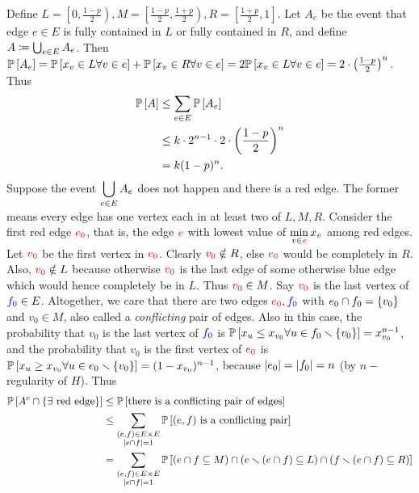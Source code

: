 {Define $L=\left[0,\frac{1-p}{2}\right), M=\left[\frac{1-p}2,\frac{1+p}2\right), R=\left[\frac{1+p}2,1\right]$. Let $A_e$ be the event that edge $e\in E$ is fully contained in $L$ or fully contained in $R$, and define $A\sett \bigcup_{e\in E}A_e$. Then $\P{A_e} = \P{x_v\in L\forall v\in e} + \P{x_v\in R\forall v\in e} = 2\P{x_v\in L\forall v\in e} = 2 \cdot\left(\frac{1-p}{2}\right)^n$. Thus \begin{align*}
\P A &\leq \sum_{e\in E} \P{A_e} \\
&\leq k\cdot 2^{n-1} \cdot 2 \cdot \left(\frac{1-p}{2}\right)^n \\
&= k(1-p)^n.
\end{align*}
Suppose the event $\ds\bigcup_{e\in E} A_e$ does not happen and there is a red edge. The former means every edge has one vertex each in at least two of $L,M,R$. Consider the first red edge $\color{red} e_0$, that is, the edge $\color{red} e$ with lowest value of $\ds\min_{v\in {\color{red}e}}x_v$ among red edges. Let $\color{red}v_0$ be the first vertex in $\color{red} e_0$. Clearly ${\color{red} v_0}\notin R$, else $\color{red} e_0$ would be completely in $R$. Also, ${\color{red} v_0}\notin L$ because otherwise $\color{red} v_0$ is the last edge of some otherwise blue edge which would hence completely be in $L$. Thus ${\color{red}v_0}\in M$. Say $\color{red} v_0$ is the last vertex of ${\color{blue} f_0}\in E$. Altogether, we care that there are two edges ${\color{red}e_0},{\color{blue}f_0}$ with $e_0\cap f_0 = \set{v_0}$ and $v_0\in M$, also called a \textit{conflicting} pair of edges. Also in this case, the probability that $v_0$ is the last vertex of ${\color{blue}f_0}$ is $\P{x_u \leq x_{v_0} \forall u\in f_0\smallsetminus\set{v_0}} = x_{v_0}^{n-1}$, and the probability that $v_0$ is the first vertex of ${\color{red}e_0}$ is $\P{x_u \geq x_{v_0} \forall u\in e_0\smallsetminus\set{v_0}} = (1-x_{v_0})^{n-1}$, because $\abs{e_0} = \abs{f_0} = n$ (by $n-$regularity of $H$). Thus 
\begin{align*}
\P{A^c\cap \set{\exists\text{ red edge}}} &\leq \P{\text{there is a conflicting pair of edges}}\\
&\leq \sum_{\substack{(e,f)\in E\times E\\ \abs {e\cap f}=1}} \P{(e,f)\text{ is a conflicting pair}} \\
&= \sum_{\substack{(e,f)\in E\times E\\ \abs {e\cap f}=1}} \P{\left(e\cap f \subseteq M\right)\cap \left(e\smallsetminus(e\cap f) \subseteq L\right) \cap \left(f\smallsetminus(e\cap f) \subseteq R\right)}\\

\end{align*}}
